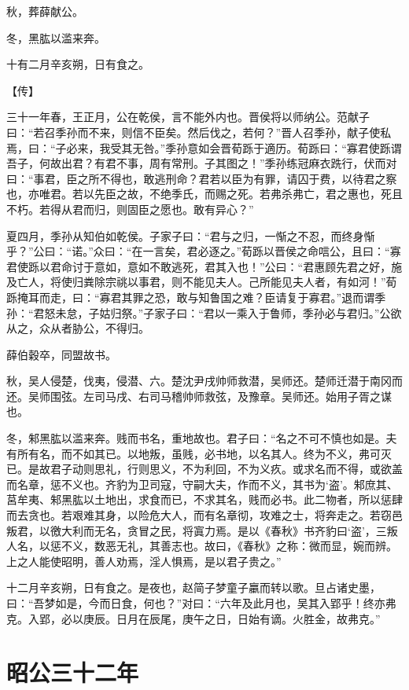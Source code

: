 \documentclass[a4paper,12pt,UTF8,twoside]{ctexbook}
\begin{document}
秋，葬薛献公。

冬，黑肱以滥来奔。

十有二月辛亥朔，日有食之。

【传】

三十一年春，王正月，公在乾侯，言不能外内也。晋侯将以师纳公。范献子曰：“若召季孙而不来，则信不臣矣。然后伐之，若何？”晋人召季孙，献子使私焉，曰：“子必来，我受其无咎。”季孙意如会晋荀跞于適历。荀跞曰：“寡君使跞谓吾子，何故出君？有君不事，周有常刑。子其图之！”季孙练冠麻衣跣行，伏而对曰：“事君，臣之所不得也，敢逃刑命？君若以臣为有罪，请囚于费，以待君之察也，亦唯君。若以先臣之故，不绝季氏，而赐之死。若弗杀弗亡，君之惠也，死且不朽。若得从君而归，则固臣之愿也。敢有异心？”

夏四月，季孙从知伯如乾侯。子家子曰：“君与之归，一惭之不忍，而终身惭乎？”公曰：“诺。”众曰：“在一言矣，君必逐之。”荀跞以晋侯之命唁公，且曰：“寡君使跞以君命讨于意如，意如不敢逃死，君其入也！”公曰：“君惠顾先君之好，施及亡人，将使归粪除宗祧以事君，则不能见夫人。己所能见夫人者，有如河！”荀跞掩耳而走，曰：“寡君其罪之恐，敢与知鲁国之难？臣请复于寡君。”退而谓季孙：“君怒未怠，子姑归祭。”子家子曰：“君以一乘入于鲁师，季孙必与君归。”公欲从之，众从者胁公，不得归。

薛伯穀卒，同盟故书。

秋，吴人侵楚，伐夷，侵潜、六。楚沈尹戌帅师救潜，吴师还。楚师迁潜于南冈而还。吴师围弦。左司马戌、右司马稽帅师救弦，及豫章。吴师还。始用子胥之谋也。

冬，邾黑肱以滥来奔。贱而书名，重地故也。君子曰：“名之不可不慎也如是。夫有所有名，而不如其已。以地叛，虽贱，必书地，以名其人。终为不义，弗可灭已。是故君子动则思礼，行则思义，不为利回，不为义疚。或求名而不得，或欲盖而名章，惩不义也。齐豹为卫司寇，守嗣大夫，作而不义，其书为‘盗’。邾庶其、莒牟夷、邾黑肱以土地出，求食而已，不求其名，贱而必书。此二物者，所以惩肆而去贪也。若艰难其身，以险危大人，而有名章彻，攻难之士，将奔走之。若窃邑叛君，以徼大利而无名，贪冒之民，将寘力焉。是以《春秋》书齐豹曰‘盗’，三叛人名，以惩不义，数恶无礼，其善志也。故曰，《春秋》之称：微而显，婉而辨。上之人能使昭明，善人劝焉，淫人惧焉，是以君子贵之。”

十二月辛亥朔，日有食之。是夜也，赵简子梦童子臝而转以歌。旦占诸史墨，曰：“吾梦如是，今而日食，何也？”对曰：“六年及此月也，吴其入郢乎！终亦弗克。入郢，必以庚辰。日月在辰尾，庚午之日，日始有谪。火胜金，故弗克。”


\chapter{昭公三十二年}
\end{document}
